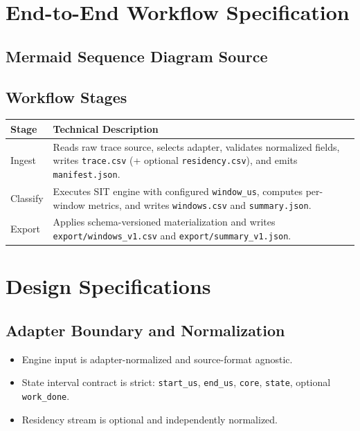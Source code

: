 \documentclass[11pt,a4paper]{article}
\begin{document}
\section{End-to-End Workflow Specification}
\subsection{Mermaid Sequence Diagram Source}


\subsection{Workflow Stages}
\begin{longtable}{>{\raggedright\arraybackslash}p{} >{\raggedright\arraybackslash}p{}}
\toprule
\textbf{Stage} & \textbf{Technical Description} \\
\midrule
Ingest & Reads raw trace source, selects adapter, validates normalized fields, writes \texttt{trace.csv} (+ optional \texttt{residency.csv}), and emits \texttt{manifest.json}. \\
Classify & Executes SIT engine with configured \texttt{window\_us}, computes per-window metrics, and writes \texttt{windows.csv} and \texttt{summary.json}. \\
Export & Applies schema-versioned materialization and writes \texttt{export/windows\_v1.csv} and \texttt{export/summary\_v1.json}. \\
\bottomrule
\end{longtable}

\section{Design Specifications}
\subsection{Adapter Boundary and Normalization}
\begin{itemize}[leftmargin=1.4em]
  \item Engine input is adapter-normalized and source-format agnostic.
  \item State interval contract is strict: \texttt{start\_us}, \texttt{end\_us}, \texttt{core}, \texttt{state}, optional \texttt{work\_done}.
  \item Residency stream is optional and independently normalized.
\end{itemize}
\end{document}
